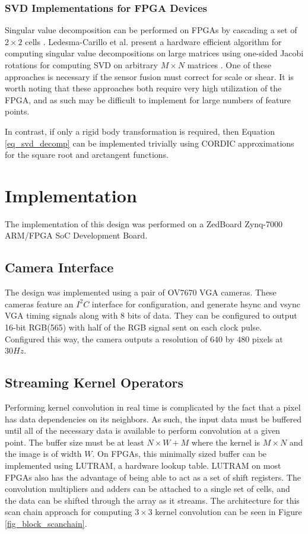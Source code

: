 \documentclass{article}
\begin{document}
\subsubsection{SVD Implementations for FPGA Devices}

Singular value decomposition can be performed on FPGAs by cascading a set of $2 \times 2$ cells \cite{wang_singular_2010}. Ledesma-Carillo et al. present a hardware efficient algorithm for computing singular value decompositions on large matrices using one-sided Jacobi rotations for computing SVD on arbitrary $M \times N$ matrices \cite{ledesma-carrillo_reconfigurable_2011}. One of these approaches is necessary if the sensor fusion must correct for scale or shear. It is worth noting that these approaches both require very high utilization of the FPGA, and as such may be difficult to implement for large numbers of feature points.

In contrast, if only a rigid body transformation is required, then Equation \ref{eq_svd_decomp} can be implemented trivially using CORDIC approximations for the square root and arctangent functions.

\section{Implementation}

The implementation of this design was performed on a ZedBoard Zynq-7000 ARM/FPGA SoC Development Board.

\subsection{Camera Interface}

The design was implemented using a pair of OV7670 VGA cameras. These cameras feature an $I^2C$ interface for configuration, and generate hsync and vsync VGA timing signals along with 8 bits of data. They can be configured to output 16-bit RGB(565) with half of the RGB signal sent on each clock pulse. Configured this way, the camera outputs a resolution of $640$ by $480$ pixels at $30Hz$. 

\subsection{Streaming Kernel Operators}

Performing kernel convolution in real time is complicated by the fact that a pixel has data dependencies on its neighbors. As such, the input data must be buffered until all of the necessary data is available to perform convolution at a given point. The buffer size must be at least $N \times W + M$ where the kernel is $M \times N$ and the image is of width $W$. On FPGAs, this minimally sized buffer can be implemented using LUTRAM, a hardware lookup table. LUTRAM on most FPGAs also has the advantage of being able to act as a set of shift registers. The convolution multipliers and adders can be attached to a single set of cells, and the data can be shifted through the array as it streams. The architecture for this scan chain approach for computing $3 \times 3$ kernel convolution can be seen in Figure \ref{fig_block_scanchain}.
\end{document}
